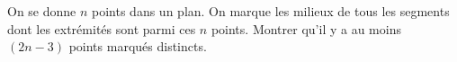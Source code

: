 On se donne $n$ points dans un plan. On marque les milieux de tous les segments dont les extrémités sont parmi ces $n$ points. Montrer qu'il y a au moins $(2n - 3)$ points marqués distincts.
